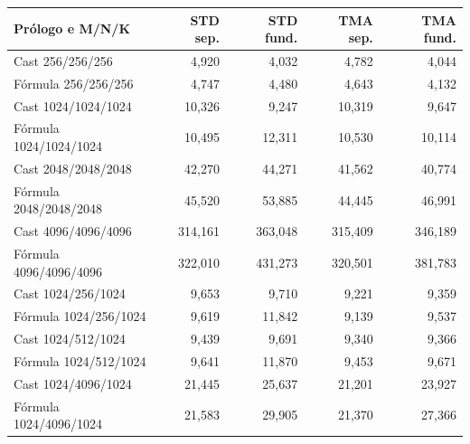 \begin{tabularx}{\linewidth}{Xrrrr}
\toprule
Prólogo e M/N/K & STD sep. & STD fund. & TMA sep. & TMA fund. \\
\midrule
Cast 256/256/256 & 4,920 & 4,032 & 4,782 & 4,044 \\
Fórmula 256/256/256 & 4,747 & 4,480 & 4,643 & 4,132 \\
Cast 1024/1024/1024 & 10,326 & 9,247 & 10,319 & 9,647 \\
Fórmula 1024/1024/1024 & 10,495 & 12,311 & 10,530 & 10,114 \\
Cast 2048/2048/2048 & 42,270 & 44,271 & 41,562 & 40,774 \\
Fórmula 2048/2048/2048 & 45,520 & 53,885 & 44,445 & 46,991 \\
Cast 4096/4096/4096 & 314,161 & 363,048 & 315,409 & 346,189 \\
Fórmula 4096/4096/4096 & 322,010 & 431,273 & 320,501 & 381,783 \\
Cast 1024/256/1024 & 9,653 & 9,710 & 9,221 & 9,359 \\
Fórmula 1024/256/1024 & 9,619 & 11,842 & 9,139 & 9,537 \\
Cast 1024/512/1024 & 9,439 & 9,691 & 9,340 & 9,366 \\
Fórmula 1024/512/1024 & 9,641 & 11,870 & 9,453 & 9,671 \\
Cast 1024/4096/1024 & 21,445 & 25,637 & 21,201 & 23,927 \\
Fórmula 1024/4096/1024 & 21,583 & 29,905 & 21,370 & 27,366 \\
\bottomrule
\end{tabularx}
